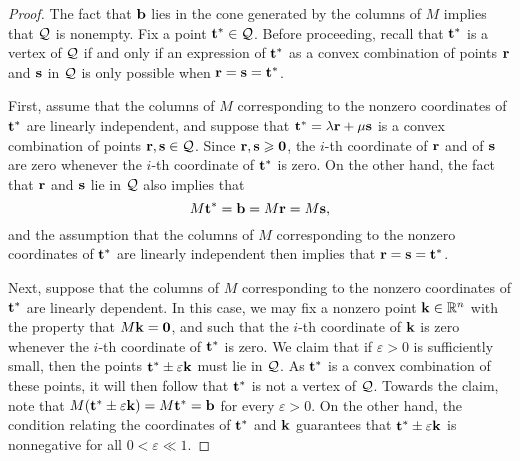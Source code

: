 \documentclass[11pt]{amsart}
\begin{document}
\begin{proof}
   The fact that $\mathbf{b}$ lies in the cone generated by the columns of $M$ implies that $\mathcal{Q}$ is nonempty.
   Fix a point $\mathbf{t}^{\ast} \in \mathcal{Q}$.
   Before proceeding, recall that $\mathbf{t}^{\ast}$ is a vertex of $\mathcal{Q}$ if and only if an expression of $\mathbf{t}^{\ast}$ as a convex combination of points $\mathbf{r}$ and $\mathbf{s}$ in $\mathcal{Q}$ is only possible when $\mathbf{r}=\mathbf{s}=\mathbf{t}^{\ast}$.

   First, assume that the columns of $M$ corresponding to the nonzero coordinates of $\mathbf{t}^{\ast}$ are linearly independent, and suppose that $\mathbf{t}^{\ast} = \lambda \mathbf{r} + \mu \mathbf{s}$ is a convex combination of points $\mathbf{r}, \mathbf{s} \in \mathcal{Q}$.
   Since $\mathbf{r},\mathbf{s}\geqslant \mathbf{0}$, the $i$-th coordinate of $\mathbf{r}$ and of $\mathbf{s}$ are zero whenever the $i$-th coordinate of $\mathbf{t}^{\ast}$ is zero.
   On the other hand, the fact that $\mathbf{r}$ and $\mathbf{s}$ lie in $\mathcal{Q}$ also implies that
   \[ M \mathbf{t}^{\ast} = \mathbf{b} = M \mathbf{r} = M \mathbf{s}, \]
   and the assumption that the columns of $M$ corresponding to the nonzero coordinates of $\mathbf{t}^{\ast}$ are linearly independent then implies that $\mathbf{r}=\mathbf{s}=\mathbf{t}^{\ast}$.

Next, suppose that the columns of $M$ corresponding to the nonzero coordinates of $\mathbf{t}^{\ast}$ are linearly dependent.   In this case, we may fix a nonzero point $\mathbf{k} \in \mathbb{R}^n$ with the property that $M \mathbf{k} = \mathbf{0}$, and such that the $i$-th coordinate of $\mathbf{k}$ is zero whenever the $i$-th coordinate of $\mathbf{t}^{\ast}$ is zero.  We claim that if $\varepsilon > 0$ is sufficiently small, then the points $\mathbf{t}^{\ast} \pm \varepsilon \mathbf{k}$ must lie in $\mathcal{Q}$.   As $\mathbf{t}^{\ast}$ is a convex combination of these points, it will then follow that $\mathbf{t}^{\ast}$ is not a vertex of $\mathcal{Q}$.  Towards the claim, note that $M(\mathbf{t}^{\ast} \pm \varepsilon \mathbf{k}) = M \mathbf{t}^{\ast} = \mathbf{b}$ for every $\varepsilon > 0$.  On the other hand, the condition relating the coordinates of $\mathbf{t}^{\ast}$ and $\mathbf{k}$ guarantees that $\mathbf{t}^{\ast} \pm \varepsilon \mathbf{k}$ is nonnegative for all $0 < \varepsilon \ll 1$.
\end{proof}
\end{document}
